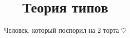 \documentclass{article}
\title{Теория типов}
\author{Человек, который поспорил на 2 торта $\heartsuit$}
\date{}
\begin{document}
\theoremstyle{definition}
\newtheorem*{definition}{Определение}
\theoremstyle{plain}
\newtheorem{theorem}{Теорема}[section]
\newtheorem{axiom}{Аксиома}
\newtheorem{lemma}[theorem]{Лемма}
\newtheorem{statement}[theorem]{Утверждение}
\newtheorem{corollary}[theorem]{Следствие}
\theoremstyle{remark}
\newtheorem*{example}{Пример}

\lstset{language=C++}

\newcommand{\todo}{\textsc{\textbf{TODO}}}

\maketitle
\tableofcontents
\newpage

 \newpage
 \newpage
\end{document}
